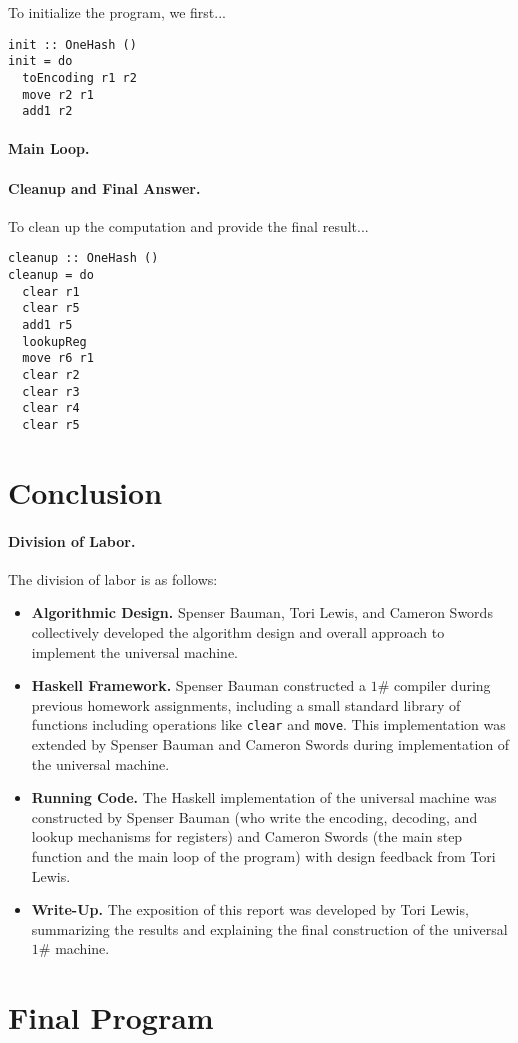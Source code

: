\documentclass[10pt, preprint, nocopyrightspace]{sigplanconf}
\newcommand{\oh}{$1\#$\xspace}
\begin{document}
To initialize the program, we first...

\begin{lstlisting}
init :: OneHash ()
init = do
  toEncoding r1 r2
  move r2 r1
  add1 r2
\end{lstlisting}

\paragraph{Main Loop.}

\paragraph{Cleanup and Final Answer.}

To clean up the computation and provide the final result...

\begin{lstlisting}
cleanup :: OneHash ()
cleanup = do
  clear r1
  clear r5
  add1 r5
  lookupReg
  move r6 r1
  clear r2
  clear r3
  clear r4
  clear r5
\end{lstlisting}

\section{Conclusion}

\paragraph{Division of Labor.} The division of labor is as follows:
\begin{itemize}
\item \textbf{Algorithmic Design.}
      Spenser Bauman, Tori Lewis, and Cameron Swords collectively developed the
      algorithm design and overall approach to implement the universal machine.
\item \textbf{Haskell Framework.}
      Spenser Bauman constructed a \oh compiler during previous homework
      assignments, including a small standard library of functions including
      operations like \lstinline{clear} and \lstinline{move}. This
      implementation was extended by Spenser Bauman and Cameron Swords during
      implementation of the universal machine.
\item \textbf{Running Code.}
      The Haskell implementation of the universal machine was constructed by
      Spenser Bauman (who write the encoding, decoding, and lookup mechanisms
      for registers) and Cameron Swords (the main step function and the main
      loop of the program) with design feedback from Tori Lewis.
\item \textbf{Write-Up.}
      The exposition of this report was developed by Tori Lewis, summarizing the
      results and explaining the final construction of the universal \oh
      machine.
\end{itemize}

\clearpage

\appendix

\section{Final Program}


\end{document}
